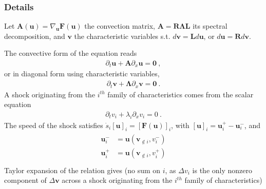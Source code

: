 \documentclass[letterpaper,10pt,english]{jupyterBook}
\begin{document}
\subsubsection*{Details}

\sphinxAtStartPar
Let \(\mathbf{A}(\mathbf{u}) = \nabla_{\mathbf{u}} \mathbf{F}(\mathbf{u})\) the convection matrix, \(\mathbf{A} = \mathbf{R} \boldsymbol\Lambda \mathbf{L}\) its spectral decomposition, and \(\mathbf{v}\) the characteristic variables s.t. \(d \mathbf{v} = \mathbf{L} d \mathbf{u}\), or \(d \mathbf{u} = \mathbf{R} d \mathbf{v}\).

\sphinxAtStartPar
The convective form of the equation reads
\begin{equation*}
\begin{split}\partial_t \mathbf{u} + \mathbf{A} \partial_x \mathbf{u} = \mathbf{0} \ ,\end{split}
\end{equation*}
\sphinxAtStartPar
or in diagonal form using characteristic variables,
\begin{equation*}
\begin{split}\partial_t \mathbf{v} + \boldsymbol\Lambda \partial_x \mathbf{v} = \mathbf{0} \ .\end{split}
\end{equation*}
\sphinxAtStartPar
A shock originating from the \(i^{th}\) family of characteristics comes from the scalar equation
\begin{equation*}
\begin{split}\partial_t v_i + \lambda_i \partial_x v_i = 0 \ .\end{split}
\end{equation*}
\sphinxAtStartPar
The speed of the shock satisfies \(\dot{s}_i [ \mathbf{u} ]_i = [ \mathbf{F}(\mathbf{u}) ]_i\), with \([ \mathbf{u} ]_i = \mathbf{u}_i^+ - \mathbf{u}_i^-\), and
\begin{equation*}
\begin{split}\begin{aligned}
  \mathbf{u}_i^- & = \mathbf{u}(\mathbf{v}_{\notin i}, v_i^-) \\
  \mathbf{u}_i^+ & = \mathbf{u}(\mathbf{v}_{\notin i}, v_i^+) \\
\end{aligned}\end{split}
\end{equation*}
\sphinxAtStartPar
Taylor expansion of the relation gives (no sum on \(i\), as \(\Delta v_i\) is the only non\sphinxhyphen{}zero component of \(\Delta \mathbf{v}\) across a shock originating from the \(i^{th}\) family of characteristics)
\end{document}
